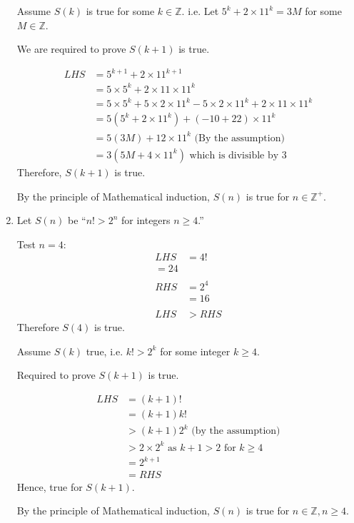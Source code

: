 \documentclass[11pt, a4paper, oneside]{exam}
\theoremstyle{definition}\newtheorem{define}{Definition}[section]
\theoremstyle{remark}\newtheorem{remark}{Remark}
\theoremstyle{definition}\newtheorem{example}{Example}[subsection]
\theoremstyle{definition}\newtheorem{notation}{Notation}[section]
\theoremstyle{definition}\newtheorem{theorem}{Theorem}[section]
\theoremstyle{definition}\newtheorem{corollary}{Corollary}[section]
\begin{document}
\begin{enumerate}
Assume $S(k)$ is true for some $k \in\mathbb{Z}$. i.e. Let $5^k + 2\times 11^k = 3M$ for some $M \in \mathbb{Z}$.

We are required to prove $S(k+1)$ is true.

\begin{align*}
LHS & = 5^{k+1} + 2\times 11^{k+1}\\
& = 5\times5^k + 2\times11\times11^k\\
& = 5\times 5^k + 5 \times 2\times 11^k - 5 \times 2\times 11^k + 2\times 11 \times 11^k\\
& = 5(5^k + 2\times 11^k) + (-10 + 22)\times 11^k\\
& = 5(3M) + 12\times 11^k \mbox{ (By the assumption)}\\
& = 3(5M + 4\times 11^k) \mbox{ which is divisible by 3}
\end{align*}
Therefore, $S(k+1)$ is true.

By the principle of Mathematical induction, $S(n)$ is true for $n \in \mathbb{Z}^+$.

\item %

Let $S(n)$ be ``$n! > 2^n$ for integers $n \geq 4$.''

Test $n = 4$:
\begin{align*}
LHS & = 4!\\
 = 24\\
 \\
 RHS & = 2^4 \\
 & = 16\\
 \\
 LHS & > RHS 
\end{align*}
Therefore $S(4)$ is true.

Assume $S(k)$ true, i.e. $k! > 2^k$ for some integer $k \geq 4$.

Required to prove $S(k+1)$ is true.

\begin{align*}
LHS & = (k+1)!\\
& = (k+1)k!\\
& > (k+1) 2^k \mbox{ (by the assumption)}\\
& > 2\times 2^k \mbox{ as $k+1 > 2$ for $k \geq 4$}\\
& = 2^{k+1}\\
& = RHS
\end{align*}
Hence, true for $S(k+1)$.

By the principle of Mathematical induction, $S(n)$ is true for $n \in \mathbb{Z}, n \geq 4$.





\end{enumerate}
\end{document}
